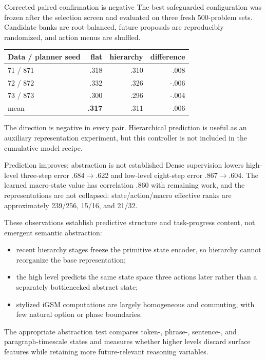 \documentclass[aspectratio=169,10pt]{beamer}
\newcommand{\good}[1]{\textcolor{cgreen}{\textbf{#1}}}
\begin{document}
\begin{frame}{Corrected paired confirmation is negative}
\small
The best safeguarded configuration was frozen after the selection screen and
evaluated on three fresh 500-problem sets. Candidate banks are root-balanced,
future proposals are reproducibly randomized, and action menus are shuffled.

\medskip
\centering
\begin{tabular}{lrrr}
\toprule
Data / planner seed & flat & hierarchy & difference\\
\midrule
71 / 871 & .318 & .310 & -.008\\
72 / 872 & .332 & .326 & -.006\\
73 / 873 & .300 & .296 & -.004\\
\midrule
mean & \good{.317} & .311 & -.006\\
\bottomrule
\end{tabular}

\medskip
The direction is negative in every pair. Hierarchical prediction is useful as
an auxiliary representation experiment, but this controller is not included
in the cumulative model recipe.
\end{frame}

\begin{frame}{Prediction improves; abstraction is not established}
\small
Dense supervision lowers high-level three-step error .684$\to$.622 and
low-level eight-step error .867$\to$.604. The learned macro-state value has
correlation .860 with remaining work, and the representations are not
collapsed: state/action/macro effective ranks are approximately
239/256, 15/16, and 21/32.

\medskip
These observations establish predictive structure and task-progress content,
not emergent semantic abstraction:
\begin{itemize}
\item recent hierarchy stages freeze the primitive state encoder, so hierarchy
cannot reorganize the base representation;
\item the high level predicts the same state space three actions later rather
than a separately bottlenecked abstract state;
\item stylized iGSM computations are largely homogeneous and commuting, with
few natural option or phase boundaries.
\end{itemize}

The appropriate abstraction test compares token-, phrase-, sentence-, and
paragraph-timescale states and measures whether higher levels discard surface
features while retaining more future-relevant reasoning variables.
\end{frame}
\end{document}
